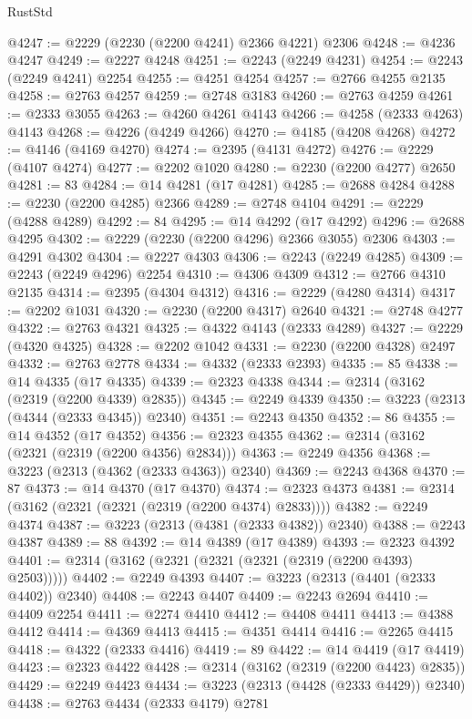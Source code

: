 \begin{lexlean}{RustStd}
\begin{coremodule}
@4247 := @2229 (@2230 (@2200 @4241) @2366 @4221) @2306
@4248 := @4236 @4247
@4249 := @2227 @4248
@4251 := @2243 (@2249 @4231)
@4254 := @2243 (@2249 @4241) @2254
@4255 := @4251 @4254
@4257 := @2766 @4255 @2135
@4258 := @2763 @4257
@4259 := @2748 @3183
@4260 := @2763 @4259
@4261 := @2333 @3055
@4263 := @4260 @4261 @4143
@4266 := @4258 (@2333 @4263) @4143
@4268 := @4226 (@4249 @4266)
@4270 := @4185 (@4208 @4268)
@4272 := @4146 (@4169 @4270)
@4274 := @2395 (@4131 @4272)
@4276 := @2229 (@4107 @4274)
@4277 := @2202 @1020
@4280 := @2230 (@2200 @4277) @2650
@4281 := 83
@4284 := @14 @4281 (@17 @4281)
@4285 := @2688 @4284
@4288 := @2230 (@2200 @4285) @2366
@4289 := @2748 @4104
@4291 := @2229 (@4288 @4289)
@4292 := 84
@4295 := @14 @4292 (@17 @4292)
@4296 := @2688 @4295
@4302 := @2229 (@2230 (@2200 @4296) @2366 @3055) @2306
@4303 := @4291 @4302
@4304 := @2227 @4303
@4306 := @2243 (@2249 @4285)
@4309 := @2243 (@2249 @4296) @2254
@4310 := @4306 @4309
@4312 := @2766 @4310 @2135
@4314 := @2395 (@4304 @4312)
@4316 := @2229 (@4280 @4314)
@4317 := @2202 @1031
@4320 := @2230 (@2200 @4317) @2640
@4321 := @2748 @4277
@4322 := @2763 @4321
@4325 := @4322 @4143 (@2333 @4289)
@4327 := @2229 (@4320 @4325)
@4328 := @2202 @1042
@4331 := @2230 (@2200 @4328) @2497
@4332 := @2763 @2778
@4334 := @4332 (@2333 @2393)
@4335 := 85
@4338 := @14 @4335 (@17 @4335)
@4339 := @2323 @4338
@4344 := @2314 (@3162 (@2319 (@2200 @4339) @2835))
@4345 := @2249 @4339
@4350 := @3223 (@2313 (@4344 (@2333 @4345)) @2340)
@4351 := @2243 @4350
@4352 := 86
@4355 := @14 @4352 (@17 @4352)
@4356 := @2323 @4355
@4362 := @2314 (@3162 (@2321 (@2319 (@2200 @4356) @2834)))
@4363 := @2249 @4356
@4368 := @3223 (@2313 (@4362 (@2333 @4363)) @2340)
@4369 := @2243 @4368
@4370 := 87
@4373 := @14 @4370 (@17 @4370)
@4374 := @2323 @4373
@4381 := @2314 (@3162 (@2321 (@2321 (@2319 (@2200 @4374) @2833))))
@4382 := @2249 @4374
@4387 := @3223 (@2313 (@4381 (@2333 @4382)) @2340)
@4388 := @2243 @4387
@4389 := 88
@4392 := @14 @4389 (@17 @4389)
@4393 := @2323 @4392
@4401 := @2314 (@3162 (@2321 (@2321 (@2321 (@2319 (@2200 @4393) @2503)))))
@4402 := @2249 @4393
@4407 := @3223 (@2313 (@4401 (@2333 @4402)) @2340)
@4408 := @2243 @4407
@4409 := @2243 @2694
@4410 := @4409 @2254
@4411 := @2274 @4410
@4412 := @4408 @4411
@4413 := @4388 @4412
@4414 := @4369 @4413
@4415 := @4351 @4414
@4416 := @2265 @4415
@4418 := @4322 (@2333 @4416)
@4419 := 89
@4422 := @14 @4419 (@17 @4419)
@4423 := @2323 @4422
@4428 := @2314 (@3162 (@2319 (@2200 @4423) @2835))
@4429 := @2249 @4423
@4434 := @3223 (@2313 (@4428 (@2333 @4429)) @2340)
@4438 := @2763 @4434 (@2333 @4179) @2781

\end{coremodule}
\end{lexlean}
